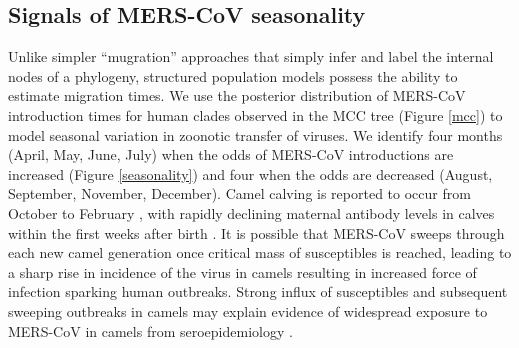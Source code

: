 \documentclass[11pt,oneside,letterpaper]{article}
\begin{document}
\subsection*{Signals of MERS-CoV seasonality}
Unlike simpler ``mugration'' approaches that simply infer and label the internal nodes of a phylogeny,
structured population models possess the ability to estimate migration times. %
We use the posterior distribution of MERS-CoV introduction times for human clades observed in the MCC tree (Figure \ref{mcc}) to model seasonal variation in zoonotic transfer of viruses.
We identify four months (April, May, June, July) when the odds of MERS-CoV introductions are increased (Figure \ref{seasonality}) and four when the odds are decreased (August, September, November, December).
Camel calving is reported to occur from October to February \citep{almutairi_non-genetic_2010}, with rapidly declining maternal antibody levels in calves within the first weeks after birth \citep{wernery_camelid_2001}.
It is possible that MERS-CoV sweeps through each new camel generation once critical mass of susceptibles is reached, leading to a sharp rise in incidence of the virus in camels resulting in increased force of infection sparking human outbreaks.
Strong influx of susceptibles and subsequent sweeping outbreaks in camels may explain evidence of widespread exposure to MERS-CoV in camels from seroepidemiology \citep{muller_2014,corman_antibodies_2014,chu_2014,reusken_2013,reusken_2014}.
\end{document}
